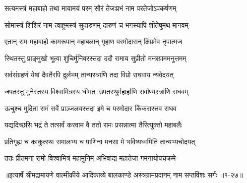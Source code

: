 \twolineshloka
{सत्यमस्त्रं महाबाहो तथा मायामयं परम्}
{सौरं तेजःप्रभं नाम परतेजोऽपकर्षणम्} %

\twolineshloka
{सोमास्त्रं शिशिरं नाम त्वाष्ट्रमस्त्रं सुदारुणम्}
{दारुणं च भगस्यापि शीतेषुमथ मानवम्} %

\twolineshloka
{एतान् राम महाबाहो कामरूपान् महाबलान्}
{गृहाण परमोदारान् क्षिप्रमेव नृपात्मज} %

\twolineshloka
{स्थितस्तु प्राङ्मुखो भूत्वा शुचिर्मुनिवरस्तदा}
{ददौ रामाय सुप्रीतो मन्त्रग्राममनुत्तमम्} %

\twolineshloka
{सर्वसंग्रहणं येषां दैवतैरपि दुर्लभम्}
{तान्यस्त्राणि तदा विप्रो राघवाय न्यवेदयत्} %

\twolineshloka
{जपतस्तु मुनेस्तस्य विश्वामित्रस्य धीमतः}
{उपतस्थुर्महार्हाणि सर्वाण्यस्त्राणि राघवम्} %

\twolineshloka
{ऊचुश्च मुदिता रामं सर्वे प्राञ्जलयस्तदा}
{इमे च परमोदार किंकरास्तव राघव} %

\twolineshloka
{यद्यदिच्छसि भद्रं ते तत्सर्वं करवाम वै}
{ततो रामः प्रसन्नात्मा तैरित्युक्तो महाबलैः} %

\twolineshloka
{प्रतिगृह्य च काकुत्स्थः समालभ्य च पाणिना}
{मनसा मे भविष्यध्वमिति तान्यभ्यचोदयत्} %

\twolineshloka
{ततः प्रीतमना रामो विश्वामित्रं महामुनिम्}
{अभिवाद्य महातेजा गमनायोपचक्रमे} %


॥इत्यार्षे श्रीमद्रामायणे वाल्मीकीये आदिकाव्ये बालकाण्डे अस्त्रग्रामप्रदानम् नाम सप्तविंशः सर्गः ॥१-२७॥
